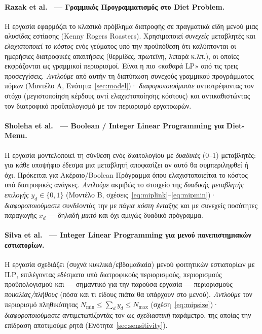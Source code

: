 \documentclass[11pt,a4paper]{article}
\newcommand{\en}[1]{\textenglish{#1}}
\begin{document}
\paragraph{\en{Razak et al.}~\cite{razak} — Γραμμικός Προγραμματισμός στο \en{Diet Problem}.}
Η εργασία εφαρμόζει το κλασικό πρόβλημα διατροφής σε πραγματικά είδη μενού μιας
αλυσίδας εστίασης (\en{Kenny Rogers Roasters}). Χρησιμοποιεί \emph{συνεχείς}
μεταβλητές και \emph{ελαχιστοποιεί το κόστος} ενός γεύματος υπό την προϋπόθεση ότι
καλύπτονται οι ημερήσιες διατροφικές απαιτήσεις (θερμίδες, πρωτεΐνη, λιπαρά κ.λπ.),
οι οποίες εκφράζονται ως γραμμικοί περιορισμοί. Είναι η πιο «καθαρά \en{LP}» από
τις τρεις προσεγγίσεις. \emph{Αντλούμε} από αυτήν τη διατύπωση συνεχούς γραμμικού
προγράμματος πόρων (Μοντέλο Α, Ενότητα~\ref{sec:model})· \emph{διαφοροποιούμαστε}
αντιστρέφοντας τον στόχο (μεγιστοποίηση κέρδους αντί ελαχιστοποίησης κόστους) και
αντικαθιστώντας τον διατροφικό προϋπολογισμό με τον περιορισμό εργατοωρών.

\paragraph{\en{Sholeha et al.}~\cite{sholeha} — \en{Boolean / Integer Linear Programming} για \en{Diet-Menu}.}
Η εργασία μοντελοποιεί τη σύνθεση ενός διαιτολογίου με \emph{δυαδικές} (0--1)
μεταβλητές: για κάθε υποψήφιο έδεσμα μια μεταβλητή αποφασίζει αν αυτό θα
συμπεριληφθεί ή όχι. Πρόκειται για Ακέραιο/\en{Boolean} Πρόγραμμα όπου
ελαχιστοποιείται το κόστος υπό διατροφικές ανάγκες. \emph{Αντλούμε} ακριβώς το
στοιχείο της \emph{δυαδικής μεταβλητής επιλογής} $y_d\in\{0,1\}$ (Μοντέλο Β,
σχέσεις~\eqref{eq:miplink}--\eqref{eq:mipmin})· \emph{διαφοροποιούμαστε} συνδέοντάς
την με \emph{πάγια κόστη ένταξης} και με συνεχείς ποσότητες παραγωγής $x_d$ ---
δηλαδή \emph{μικτό} και όχι αμιγώς δυαδικό πρόγραμμα.

\paragraph{\en{Silva et al.}~\cite{silva} — \en{Integer Linear Programming} για μενού πανεπιστημιακών εστιατορίων.}
Η εργασία σχεδιάζει (συχνά κυκλικά/εβδομαδιαία) μενού φοιτητικών εστιατορίων με
\en{ILP}, επιλέγοντας εδέσματα υπό διατροφικούς περιορισμούς, περιορισμούς
προϋπολογισμού και --- σημαντικό για την παρούσα εργασία --- περιορισμούς
\emph{ποικιλίας/πλήθους} (πόσα και τι είδους πιάτα θα υπάρχουν στο μενού).
\emph{Αντλούμε} τον περιορισμό πληθικότητας $N_{\min}\le\sum_d y_d\le N_{\max}$
(σχέση~\eqref{eq:mipsize})· \emph{διαφοροποιούμαστε} αντιμετωπίζοντάς τον ως
\emph{σχεδιαστική} παράμετρο, της οποίας την επίδραση αποτιμούμε ρητά
(Ενότητα~\ref{sec:sensitivity}).
\end{document}

